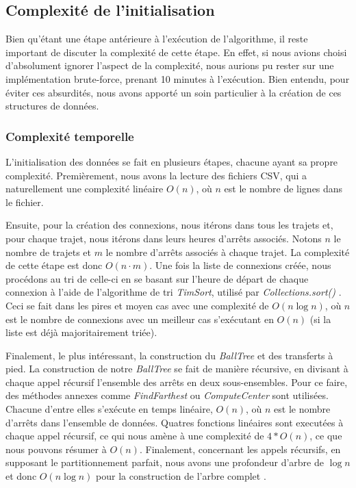 \documentclass[12pt]{article}
\begin{document}
\newpage
\subsection{Complexité de l'initialisation}
Bien qu'étant une étape antérieure à l'exécution de l'algorithme, il reste important de discuter la complexité de cette étape. En effet, si nous avions choisi d'absolument ignorer
l'aspect de la complexité, nous aurions pu rester sur une implémentation brute-force, prenant 10 minutes à l'exécution. Bien entendu, pour éviter ces absurdités, nous avons apporté
un soin particulier à la création de ces structures de données.

\subsubsection{Complexité temporelle}
\label{sec:complexitetempinit}
L'initialisation des données se fait en plusieurs étapes, chacune ayant sa propre complexité. Premièrement, nous avons la lecture des fichiers CSV, qui a naturellement une complexité
linéaire $O(n)$, où $n$ est le nombre de lignes dans le fichier. 

Ensuite, pour la création des connexions, nous itérons dans tous les trajets et, pour chaque trajet, nous itérons dans leurs heures d'arrêts associés. Notons $n$ le nombre de trajets et $m$ le 
nombre d'arrêts associés à chaque trajet. La complexité de cette étape est donc $O(n \cdot m)$. Une fois la liste de connexions créée, nous procédons au tri de celle-ci en se basant sur 
l'heure de départ de chaque connexion à l'aide de l'algorithme de tri \emph{TimSort}, utilisé par \emph{Collections.sort()} \cite{javaTimSort}. Ceci se fait dans les pires et
moyen cas avec une complexité de $O(n \log n)$, où $n$ est le nombre de connexions avec un meilleur cas s'exécutant en $O(n)$ (si la liste est déjà majoritairement triée).

Finalement, le plus intéressant, la construction du \emph{BallTree} et des transferts à pied. La construction de notre \emph{BallTree} se fait de manière récursive, en divisant à chaque appel 
récursif l'ensemble des arrêts en deux sous-ensembles. Pour ce faire, des méthodes annexes comme \emph{FindFarthest} ou \emph{ComputeCenter} sont utilisées. Chacune d'entre elles s'exécute en 
temps linéaire, $O(n)$, où $n$ est le nombre d'arrêts dans l'ensemble de données. Quatres fonctions linéaires sont executées à chaque appel récursif, ce qui nous amène à une complexité de 
$4 * O(n)$, ce que nous pouvons résumer à $O(n)$. Finalement, concernant les appels récursifs, en supposant le partitionnement parfait, nous avons une profondeur d'arbre de $\log n$ et donc 
$O(n \log n)$ pour la construction de l'arbre complet \cite{BallTreedoc}.
\end{document}
